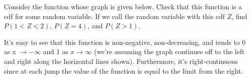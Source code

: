 \begin{examp}
Consider the function whose graph is given below. Check that this function is a cdf for some random variable. If we call the random variable with this cdf $Z$, find $P(1 < Z < 2)$, $P(Z = 4)$, and $P(Z > 1)$.

\begin{center}
\end{center}

\par
\noindent It's easy to see that this function is non-negative, non-decreasing, and tends to $0$ as x $\to -\infty$ and 1 as $x \to \infty$ (we're assuming the graph continues off to the left and right along the horizontal lines shown). Furthermore, it's right-continuous since at each jump the value of the function is equal to the limit from the right.
\vspace{0.5em}
\vspace{1.5em}
\end{examp}

